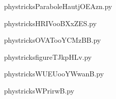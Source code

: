     \newcommand{\CaptionFigParaboleHautjOEAzn}{<+Type your caption here+>}
    \begin{center}
        
    \end{center}
    phystricksParaboleHautjOEAzn.py

    

    \clearpage
    


    \newcommand{\CaptionFigHRIVooBXxZES}{<+Type your caption here+>}
    \begin{center}
        
    \end{center}
    phystricksHRIVooBXxZES.py

    

    \clearpage
    


    \newcommand{\CaptionFigOVATooYCMzBB}{<+Type your caption here+>}
    \begin{center}
        
    \end{center}
    phystricksOVATooYCMzBB.py

    

    \clearpage
    


    \newcommand{\CaptionFigfigureTJkpHLv}{<+Type your caption here+>}
    \begin{center}
        
    \end{center}
    phystricksfigureTJkpHLv.py

    

    \clearpage
    


    \newcommand{\CaptionFigWUEUooYWwanB}{<+Type your caption here+>}
    \begin{center}
        
    \end{center}
    phystricksWUEUooYWwanB.py

    

    \clearpage
    


    \newcommand{\CaptionFigWPrirwB}{<+Type your caption here+>}
    \begin{center}
        
    \end{center}
    phystricksWPrirwB.py

